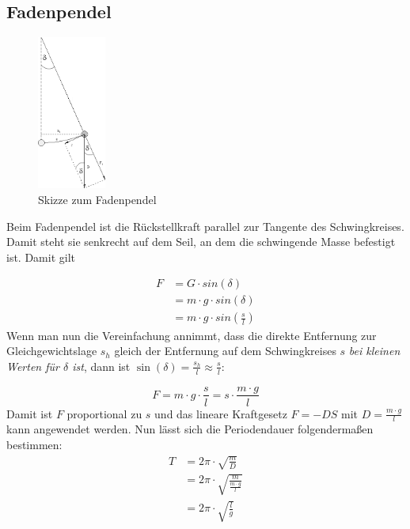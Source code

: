 \documentclass[a4paper]{article}
\begin{document}
		\subsection{Fadenpendel}
		
			\begin{figure}[H]
				\centering
				\includegraphics[width=0.2\textwidth]{img/fadenpend02_mechanschwing_gru.png}
				\caption{Skizze zum Fadenpendel}
				\label{img:fadenpend02_mechanschwing_gru}
			\end{figure}
			Beim Fadenpendel ist die Rückstellkraft parallel zur Tangente des Schwingkreises. Damit steht sie senkrecht auf dem Seil, an dem die schwingende Masse befestigt ist. Damit gilt
			
			\begin{equation}
			\begin{aligned}
					F &= G \cdot sin(\delta)\\
					&= m \cdot g \cdot sin(\delta)\\
					&= m \cdot g \cdot sin(\frac{s}{l})
				\end{aligned}
			\end{equation}
			Wenn man nun die Vereinfachung annimmt, dass die direkte Entfernung zur Gleichgewichtslage $s_h$ gleich der Entfernung auf dem Schwingkreises $s$ \textit{bei kleinen Werten für $\delta$ ist}, dann ist $\sin(\delta) = \frac{s_h}{l} \approx \frac{s}{l}$:
			
			\begin{equation}
					F = m \cdot g \cdot \frac{s}{l} = s \cdot \frac{m \cdot g}{l}
			\end{equation}
			Damit ist $F$ proportional zu $s$ und das lineare Kraftgesetz $F=-DS$ mit $D=\frac{m \cdot g}{l}$ kann angewendet werden. Nun lässt sich die Periodendauer folgendermaßen bestimmen:
			\begin{equation}
				\begin{aligned}
					T&=2\pi\cdot\sqrt{\frac{m}{D}}\\
					&=2\pi\cdot\sqrt{\frac{m}{\frac{m \cdot g}{l}}}\\
					&=2\pi\cdot\sqrt{\frac{l}{g}}
				\end{aligned}
			\end{equation}
			
\end{document}
